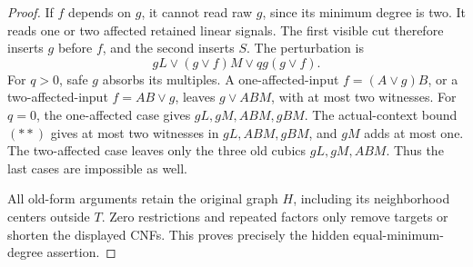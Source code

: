 \documentclass[11pt]{article}
\theoremstyle{definition}
\theoremstyle{remark}
\begin{document}
\begin{proof}
If $f$ depends on $g$, it cannot read raw $g$, since its minimum degree is two. It reads one or two affected retained linear signals. The first visible cut therefore inserts $g$ before $f$, and the second inserts $S$. The perturbation is
\[
 gL\vee(g\vee f)M\vee qg(g\vee f).
\]
For $q>0$, safe $g$ absorbs its multiples. A one-affected-input $f=(A\vee g)B$, or a two-affected-input $f=AB\vee g$, leaves $g\vee ABM$, with at most two witnesses. For $q=0$, the one-affected case gives $gL,gM,ABM,gBM$. The actual-context bound~$(**)$ gives at most two witnesses in $gL,ABM,gBM$, and $gM$ adds at most one. The two-affected case leaves only the three old cubics $gL,gM,ABM$. Thus the last cases are impossible as well.

All old-form arguments retain the original graph $H$, including its neighborhood centers outside $T$. Zero restrictions and repeated factors only remove targets or shorten the displayed CNFs. This proves precisely the hidden equal-minimum-degree assertion.
\end{proof}
\end{document}
